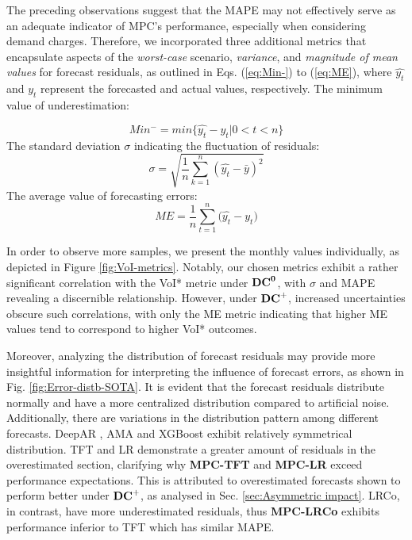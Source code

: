 The preceding observations suggest that the MAPE may not effectively serve as an adequate indicator of MPC's performance, especially when considering demand charges. Therefore, we incorporated three additional metrics that encapsulate aspects of the \emph{worst-case} scenario, \emph{variance}, and \emph{magnitude of mean values} for forecast residuals, as outlined in Eqs. (\ref{eq:Min-}) to (\ref{eq:ME}), where $\widehat{y_t}$ and $y_t$ represent the forecasted and actual values, respectively. The minimum value of underestimation:

\begin{equation} \label{eq:Min-}
    Min^- = min \{\widehat{y_{t}}-y_{t}|0<t<n \}
\end{equation}
The standard deviation $\sigma$ indicating the fluctuation of residuals:
\begin{equation} \label{eq:Std}
    \sigma=\sqrt{\frac{1}{n}{\sum_{k=1}^n (\widehat{y_t}-\bar{y})^2}}
\end{equation}
The average value of forecasting errors:
\begin{equation} \label{eq:ME}
    ME = \frac{1}{n} \sum_{t=1}^{n} (\widehat{y_{t}}-{y_{t})}
\end{equation}

In order to observe more samples, we present the monthly values individually, as depicted in Figure \ref{fig:VoI-metrics}. Notably, our chosen metrics exhibit a rather significant correlation with the VoI* metric under $\mathbf{{DC}^{0}}$, with $\sigma$ and MAPE revealing a discernible relationship. However, under $\mathbf{{DC}^{+}}$, increased uncertainties obscure such correlations, with only the ME metric indicating that higher ME values tend to correspond to higher VoI* outcomes.

Moreover, analyzing the distribution of forecast residuals may provide more insightful information for interpreting the influence of forecast errors, as shown in Fig. \ref{fig:Error-distb-SOTA}. It is evident that the forecast residuals distribute normally and have a more centralized distribution compared to artificial noise. 
Additionally, there are variations in the distribution pattern among different forecasts. DeepAR , AMA and XGBoost exhibit relatively symmetrical distribution.
TFT and LR demonstrate a greater amount of residuals in the overestimated section, clarifying why \textbf{MPC-TFT} and \textbf{MPC-LR} exceed performance expectations. This is attributed to overestimated forecasts shown to perform better under $\mathbf{{DC}^{+}}$, as analysed in Sec. \ref{sec:Asymmetric impact}. LRCo, in contrast, have more underestimated residuals, thus \textbf{MPC-LRCo} exhibits performance inferior to TFT which has similar MAPE. 


